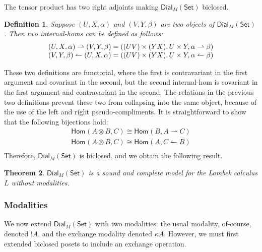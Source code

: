 \documentclass{article}
\let\to\relax                   %
\newcommand{\to}{\rightarrow}
\newcommand{\rto}{\leftharpoonup}
\newcommand{\lto}{\rightharpoonup}
\newcommand{\Set}{\mathsf{Set}}
\newcommand{\Dial}[2]{\mathsf{Dial}_{#1}(#2)}
\newcommand{\Hom}[3]{\mathsf{Hom}_{#1}(#2,#3)}
\newtheorem{theorem}{Theorem}
\newtheorem{definition}[theorem]{Definition}
\begin{document}
The tensor product has two right adjoints making $\Dial{M}{\Set}$
biclosed.
\begin{definition}
  \label{def:dial-is-biclosed}
  Suppose $(U, X, \alpha)$ and $(V, Y, \beta)$ are two objects of
  $\Dial{M}{\Set}$. Then two internal-homs can be defined as follows:
  \[
  \begin{array}{lll}
    (U, X, \alpha) \lto (V, Y, \beta) = ((U \to V) \times (Y \to X), U \times Y, \alpha \lto \beta)\\
    (V, Y, \beta) \rto (U, X, \alpha) = ((U \to V) \times (Y \to X), U \times Y, \alpha \rto \beta)\\
  \end{array}
  \]
\end{definition}
These two definitions are functorial, where the first is contravariant
in the first argument and covariant in the second, but the second
internal-hom is covariant in the first argument and contravariant in
the second.  The relations in the previous two definitions prevent
these two from collapsing into the same object, because of the use of
the left and right pseudo-compliments. It is straightforward to show
that the following bijections hold:
\[
\begin{array}{lll}
  \Hom{}{A \otimes B}{C} \cong \Hom{}{B}{A \lto C}\\
  \Hom{}{A \otimes B}{C} \cong \Hom{}{A}{C \rto B}\\
\end{array}
\]
Therefore, $\Dial{M}{\Set}$ is biclosed, and we obtain the following
result.
\begin{theorem}
  \label{thm:sound-lambek}
  $\Dial{M}{\Set}$ is a sound and complete model for the Lambek
  calculus $L$ without modalities.
\end{theorem}

\subsubsection{Modalities}
\label{subsec:modalities}
We now extend $\Dial{M}{\Set}$ with two modalities: the usual
modality, of-course, denoted $!A$, and the exchange modality denoted
$\kappa A$.  However, we must first extended biclosed posets to
include an exchange operation.
\end{document}
